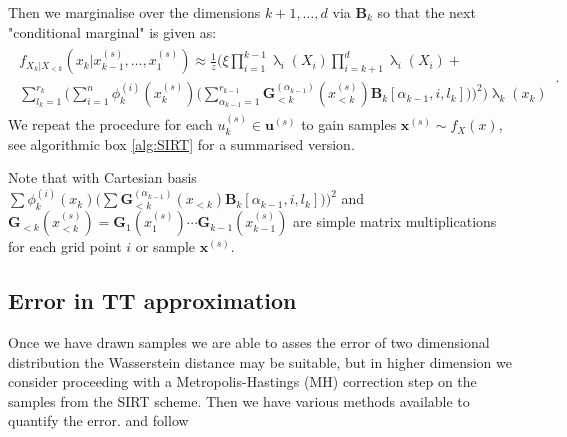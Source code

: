 Then we marginalise over the dimensions $k+1 , \dots, d$ via $\bm{B}_k$ so that the next "conditional marginal" is given as:
\begin{align}\begin{split} 
		f_{X_k|X_{<k}}(x_k|x^{(s)}_{k-1},\dots,x^{(s)}_1) \approx \frac{1}{z}
		\Bigg( 
		\xi \prod_{i=1}^{k-1} \uplambda_i(X_i) \prod_{i=k+1}^{d} \uplambda_i(X_i) + \\
		\sum_{l_{k} = 1}^{r_{k}} \Bigg( \sum_{i = 1}^{n}  \phi^{(i)}_k(x^{(s)}_k) \Bigg( \sum_{\alpha_{k-1} = 1}^{r_{k-1}} \bm{G}^{(\alpha_{k-1})}_{<k}(x^{(s)}_{<k}) \bm{B}_k[\alpha_{k-1},i,l_k] \Bigg) \Bigg)^2 \Bigg) \uplambda_k(x_k)
	\end{split} 
	\label{eq:CurrMarg} \, .
\end{align}
We repeat the procedure for each $u^{(s)}_k \in \bm{u}^{(s)}$ to gain samples $\bm{x}^{(s)} \sim f_{X}(x)$, see algorithmic box \ref{alg:SIRT} for a summarised version.



Note that with Cartesian basis $ \sum \phi^{(i)}_k(x_k) \Bigg( \sum \bm{G}^{(\alpha_{k-1})}_{<k}(x_{<k}) \bm{B}_k[\alpha_{k-1},i,l_k] \Bigg) \Bigg)^2 
$  and $\bm{G}_{<k}(x^{(s)}_{<k}) = \bm{G}_{1}(x^{(s)}_{1}) \cdots \bm{G}_{k-1}(x^{(s)}_{k-1}) $ are simple matrix multiplications for each grid point $i$ or sample $\bm{x}^{(s)}$.



\subsection{Error in TT approximation}
Once we have drawn samples we are able to asses the error of two dimensional distribution the Wasserstein distance \cite{} may be suitable, but in higher dimension we consider proceeding with a Metropolis-Hastings (MH) correction step on the samples from the SIRT scheme.
Then we have various methods available to quantify the error.
and follow \cite{dolgov2020approximation}

